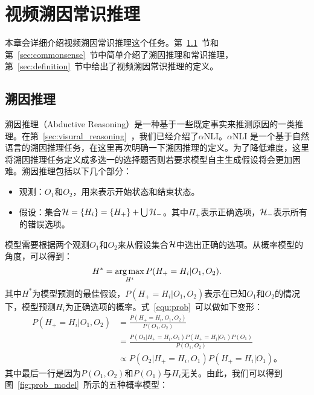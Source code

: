 
\chapter{视频溯因常识推理}\label{cha:vacr}
本章会详细介绍视频溯因常识推理这个任务。第~\ref{sec:abductive}~节和第~\ref{sec:commonsense}~节中简单介绍了溯因推理和常识推理，第~\ref{sec:definition}~节中给出了视频溯因常识推理的定义。
\section{溯因推理}\label{sec:abductive}
溯因推理（Abductive Reasoning）是一种基于一些既定事实来推测原因的一类推理。在第~\ref{sec:visural_reasoning}~，我们已经介绍了$\alpha$NLI\cite{bhagavatula2019abductive}。$\alpha$NLI 是一个基于自然语言的溯因推理任务，在这里再次明确一下溯因推理的定义。为了降低难度，这里将溯因推理任务定义成多选一的选择题否则若要求模型自主生成假设将会更加困难。溯因推理包括以下几个部分：
\begin{itemize}
    \item 观测：$O_1$和$O_2$，用来表示开始状态和结束状态。
    \item 假设：集合${\mathcal{H}}=\{H_i\}=\{H_+\}+\bigcup{\mathcal{H}}_{-}$。其中$H_+$表示正确选项，${\mathcal{H}}_-$表示所有的错误选项。
\end{itemize}
模型需要根据两个观测$O_1$和$O_2$来从假设集合${\mathcal{H}}$中选出正确的选项。从概率模型的角度\cite{bhagavatula2019abductive}，可以得到：
\begin{equation}
    H^{*}=\operatorname*{arg\,max} _{H^{i}} P(H_+=H_i | O_{1}, O_{2}).
    \label{equ:prob}
\end{equation}
其中$H^*$为模型预测的最佳假设，$P(H_+=H_i|O_1, O_2)$表示在已知$O_1$和$O_2$的情况下，模型预测$H_i$为正确选项的概率。式~\eqref{equ:prob}~可以做如下变形：
\begin{equation}
    \begin{split}
        P(H_+=H_i | O_{1}, O_{2}) &= \frac{P(H_+=H_i, O_1, O_2)}{P(O_{1}, O_{2})} \\
        &= \frac{P(O_2|H_+=H_i, O_1)P(H_+=H_i|O_1)P(O_1)}{P(O_{1}, O_{2})}\\
        &\propto P(O_2|H_+=H_i, O_1)P(H_+=H_i|O_1)。
    \end{split}
    \label{equ:prob_model}
\end{equation}
其中最后一行是因为$P(O_1, O_2)$和$P(O_1)$与$H_i$无关。由此，我们可以得到图~\ref{fig:prob_model}~所示的五种概率模型：
